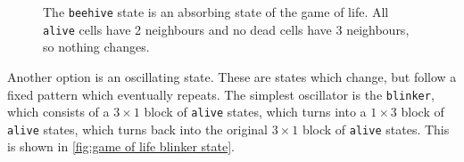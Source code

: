 \documentclass[fleqn]{NotesClass}
\begin{document}
    \begin{figure}
        \caption[Game of life \texttt{beehive} state.]{The \texttt{beehive} state is an absorbing state of the game of life. All \texttt{alive} cells have 2 neighbours and no dead cells have 3 neighbours, so nothing changes.}
        \label{fig:game of life beehive state}
    \end{figure}
    
    Another option is an oscillating state.
    These are states which change, but follow a fixed pattern which eventually repeats.
    The simplest oscillator is the \texttt{blinker}, which consists of a \(3\times 1\) block of \texttt{alive} states, which turns into a \(1 \times 3\) block of \texttt{alive} states, which turns back into the original \(3\times 1\) block of \texttt{alive} states.
    This is shown in \cref{fig:game of life blinker state}.
    
\end{document}
